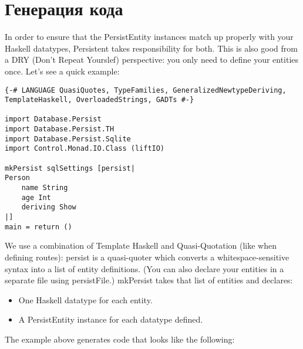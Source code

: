 \section{Генерация кода} %

In order to ensure that the PersistEntity instances match up properly with your Haskell datatypes, Persistent takes responsibility for both. This is also good from a DRY (Don't Repeat Yourslef) perspective: you only need to define your entities once. Let's see a quick example:

\begin{lstlisting}
{-# LANGUAGE QuasiQuotes, TypeFamilies, GeneralizedNewtypeDeriving, TemplateHaskell, OverloadedStrings, GADTs #-}

import Database.Persist
import Database.Persist.TH
import Database.Persist.Sqlite
import Control.Monad.IO.Class (liftIO)

mkPersist sqlSettings [persist|
Person
    name String
    age Int
    deriving Show
|]
main = return ()
\end{lstlisting}

We use a combination of Template Haskell and Quasi-Quotation (like when defining routes): persist is a quasi-quoter which converts a whitespace-sensitive syntax into a list of entity definitions. (You can also declare your entities in a separate file using persistFile.) mkPersist takes that list of entities and declares:

\begin{itemize}
  \item One Haskell datatype for each entity.
  \item A PersistEntity instance for each datatype defined.
\end{itemize}

The example above generates code that looks like the following:

